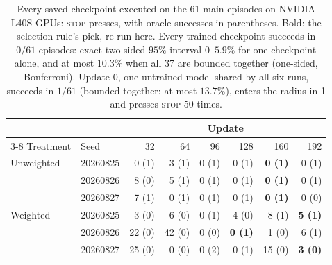 %
\begin{table}[t]
\centering
\small
\caption{Every saved checkpoint executed on the 61 main episodes on NVIDIA L40S GPUs:
\textsc{stop} presses, with oracle successes in parentheses. Bold: the selection rule's pick, re-run
here. Every trained checkpoint succeeds in $0/61$ episodes: exact two-sided $95\%$ interval
$0$--$5.9\%$ for one checkpoint alone, and at most $10.3\%$ when all 37 are bounded together
(one-sided, Bonferroni). Update 0, one untrained model shared by all six runs, succeeds in
$1/61$ (bounded together: at most $13.7\%$), enters the radius in 1 and presses
\textsc{stop} 50 times.}
\label{tab:sweep}
\begin{tabular}{@{}llrrrrrr@{}}
\toprule
 & & \multicolumn{6}{c}{Update} \\
\cmidrule(l){3-8}
Treatment & Seed & 32 & 64 & 96 & 128 & 160 & 192 \\
\midrule
Unweighted & 20260825 & 0 (1) & 3 (1) & 0 (1) & 0 (1) & \textbf{0 (1)} & 0 (1) \\
 & 20260826 & 8 (0) & 5 (1) & 0 (1) & 0 (1) & \textbf{0 (1)} & 0 (1) \\
 & 20260827 & 7 (1) & 0 (1) & 0 (1) & 0 (1) & \textbf{0 (1)} & 0 (0) \\
\midrule
Weighted & 20260825 & 3 (0) & 6 (0) & 0 (1) & 4 (0) & 8 (1) & \textbf{5 (1)} \\
 & 20260826 & 22 (0) & 42 (0) & 0 (0) & \textbf{0 (1)} & 1 (0) & 6 (1) \\
 & 20260827 & 25 (0) & 0 (0) & 0 (2) & 0 (1) & 15 (0) & \textbf{3 (0)} \\
\bottomrule
\end{tabular}
\end{table}

